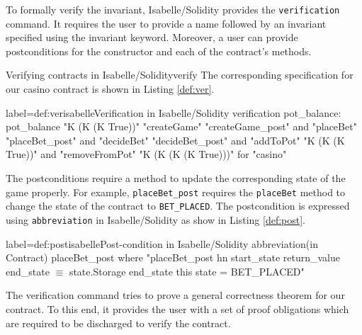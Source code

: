 \documentclass[a4paper,UKenglish,cleveref, autoref, thm-restate]{oasics-v2021}
\begin{document}
To formally verify the invariant, Isabelle/Solidity provides the \texttt{\color{isarblue}verification} command. 
It requires the user to provide a name followed by an invariant specified using the invariant keyword.
Moreover, a user can provide postconditions for the constructor and each of the contract's methods.

\begin{Example}{Verifying contracts in Isabelle/Solidity}{verify}
The corresponding specification for our casino contract is shown in Listing \ref{def:ver}.
\begin{code}{label={def:ver}}{isabelle}{Verification in Isabelle/Solidity
  \hfill{}%
}
verification pot_balance:
   pot_balance
  "K (K (K True))"
  "createGame" "createGame_post" and
  "placeBet" "placeBet_post" and
  "decideBet" "decideBet_post" and
  "addToPot" "K (K (K True))" and
  "removeFromPot" "K (K (K (K True)))"
  for "casino"
\end{code}

The postconditions require a method to update the corresponding state of the game properly.
For example, \texttt{placeBet\_{post}} requires the \texttt{placeBet} method to change the state of the contract to \texttt{BET\_PLACED}.
The postcondition is expressed using \texttt{\color{isarblue}abbreviation} in Isabelle/Solidity as show in Listing \ref{def:post}.

\begin{code}{label={def:post}}{isabelle}{Post-condition in Isabelle/Solidity
  \hfill{}%
}
abbreviation(in Contract) placeBet_post where
"placeBet_post hn start_state return_value end_state $\equiv$
  state.Storage end_state this state = BET_PLACED"
\end{code}
\end{Example}
The verification command tries to prove a general correctness theorem for our contract.
To this end, it provides the user with a set of proof obligations which are required to be discharged to verify the contract.
\end{document}
